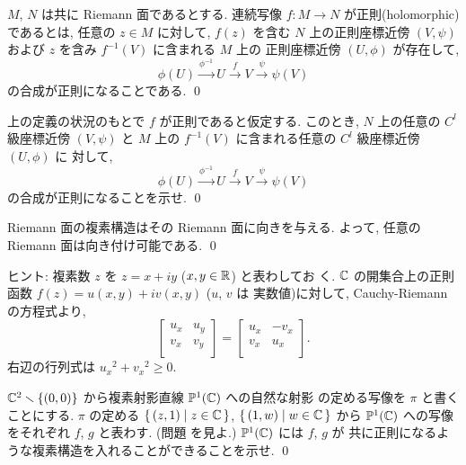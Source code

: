 \documentclass[12pt,twoside]{jarticle}
\def\R{{\Bbb R}} %
\def\C{{\Bbb C}} %
\def\P{{\Bbb P}}
\begin{document}
\begin{Definition}
  $M$, $N$ は共に Riemann 面であるとする. %
  連続写像 $f \colon M \to N$ が正則(holomorphic)であるとは, %
  任意の $z\in M$ に対して, %
  $f(z)$ を含む $N$ 上の正則座標近傍 $(V, \psi)$ および %
  $z$ を含み $f^{-1}(V)$ に含まれる $M$ 上の %
  正則座標近傍 $(U, \phi)$ が存在して,
  \[
    \phi(U)
    \overset{\phi^{-1}}\longrightarrow
    U
    \overset{f}\longrightarrow
    V
    \overset{\psi}\longrightarrow
    \psi(V)
  \]
  の合成が正則になることである. \qed
\end{Definition}

\begin{question}
  上の定義の状況のもとで $f$ が正則であると仮定する. このとき, %
  $N$ 上の任意の $C^l$ 級座標近傍 $(V,\psi)$ と %
  $M$ 上の $f^{-1}(V)$ に含まれる任意の $C^l$ 級座標近傍 $(U,\phi)$ に
  対して,
  \[
    \phi(U)
    \overset{\phi^{-1}}\longrightarrow
    U
    \overset{f}\longrightarrow
    V
    \overset{\psi}\longrightarrow
    \psi(V)
  \]
  の合成が正則になることを示せ. \qed
\end{question}

\begin{question}
  Riemann 面の複素構造はその Riemann 面に向きを与える. よって, 任意の 
  Riemann 面は向き付け可能である. \qed
\end{question}

\noindent ヒント: 複素数 $z$ を $z = x + iy$ ($x,y\in\R$) と表わしてお
く. $\C$ の開集合上の正則函数 $f(z) = u(x,y) + i v(x,y)$ ($u$, $v$ は
実数値)に対して, Cauchy-Riemann の方程式より,
\[
  \begin{bmatrix}
    u_x & u_y \\
    v_x & v_y \\
  \end{bmatrix}
  =
  \begin{bmatrix}
    u_x & - v_x \\
    v_x & u_x \\
  \end{bmatrix}.
\]
右辺の行列式は ${u_x}^2 + {v_x}^2 \ge 0$.

\begin{question}
  $\C^2 \setminus\{(0,0)\}$ から複素射影直線 $\P^1(\C)$ への自然な射影
  の定める写像を $\pi$ と書くことにする. $\pi$ の定める %
  $\{\,(z,1)\mid z\in\C\,\}$, $\{\,(1,w)\mid w\in\C\,\}$ %
  から $\P^1(\C)$ への写像をそれぞれ $f$, $g$ と表わす.  %
  (問題  を見よ.) $\P^1(\C)$ には $f$, $g$ が
  共に正則になるような複素構造を入れることができることを示せ. \qed
\end{question}
\end{document}
